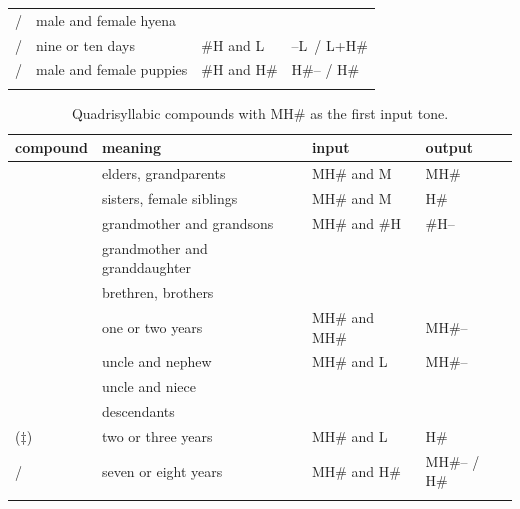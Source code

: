\begin{subtables}
\begin{table}[p]
{\begin{tabularx}{\textwidth}{ P{31mm} Q l l }
	 /  & male and female hyena &  &\\ \addlinespace \hdashline \addlinespace
	 /  & nine or ten days & \#H and L & --L~/ L+H\#\\ \addlinespace \hdashline \addlinespace
	 /  & male and female puppies & \#H and H\# & H\#-- / H\#\\
	\lspbottomrule
  \end{tabularx}}
\label{tab:examplesofcoordinativecFLOATINGH}
\end{table}

\begin{table}%
  \caption{Quadrisyllabic compounds with MH\# as the first input tone.}
  \begin{tabularx}{\textwidth}{ P{29mm} Q l l }
    \lsptoprule
  	compound & meaning & input & output\\ \midrule
    & elders, grandparents & MH\# and M & MH\#\\ \addlinespace \hdashline \addlinespace
    & sisters, female siblings & MH\# and M & H\#\\ \addlinespace \hdashline \addlinespace
    & grandmother and grandsons & MH\# and \#H & \#H--\\
	 & grandmother and granddaughter &  &\\
	 & brethren, brothers &  &\\ \addlinespace \hdashline \addlinespace
	 & one or two years & MH\# and MH\# & MH\#--\\ \addlinespace \hdashline \addlinespace
	 & uncle and nephew & MH\# and L & MH\#--\\
	 & uncle and niece &  &\\
	 & descendants &  &\\ \addlinespace \hdashline \addlinespace
	 ($\ddagger${\kern2pt}) & two or three years & MH\# and L & H\#\\ \addlinespace \hdashline \addlinespace
	 /  & seven or eight years & MH\# and H\# & MH\#-- / H\#\\
   \lspbottomrule
  \end{tabularx}
\label{tab:examplesofcoordinativeMH}
\end{table}


\end{subtables}
